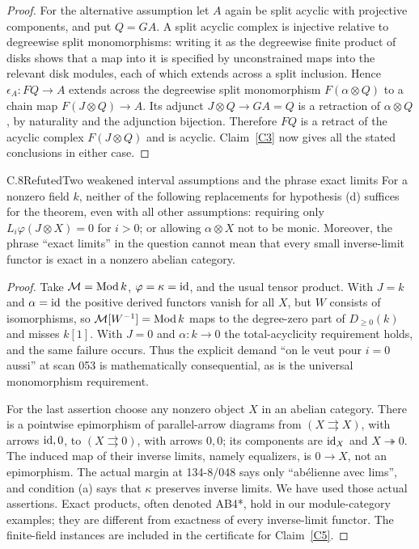 \begin{proof}
For the alternative assumption let $A$ again be split acyclic with projective components, and put $Q=GA$. A split acyclic complex is injective relative to degreewise split monomorphisms: writing it as the degreewise finite product of disks shows that a map into it is specified by unconstrained maps into the relevant disk modules, each of which extends across a split inclusion. Hence $\epsilon_A:FQ\to A$ extends across the degreewise split monomorphism $F(\alpha\otimes Q)$ to a chain map $F(J\otimes Q)\to A$. Its adjunct $J\otimes Q\to GA=Q$ is a retraction of $\alpha\otimes Q$, by naturality and the adjunction bijection. Therefore $FQ$ is a retract of the acyclic complex $F(J\otimes Q)$ and is acyclic. Claim~\ref{C3} now gives all the stated conclusions in either case.
\end{proof}

\begin{claim}{C.8}{Refuted}{Two weakened interval assumptions and the phrase exact limits}\label{C8}
For a nonzero field $k$, neither of the following replacements for hypothesis (d) suffices for the theorem, even with all other assumptions: requiring only $L_i\varphi(J\otimes X)=0$ for $i>0$; or allowing $\alpha\otimes X$ not to be monic. Moreover, the phrase ``exact limits'' in the question cannot mean that every small inverse-limit functor is exact in a nonzero abelian category.
\end{claim}
\begin{proof}
Take $\mathcal M=\operatorname{Mod} k$, $\varphi=\kappa=\operatorname{id}$, and the usual tensor product. With $J=k$ and $\alpha=\operatorname{id}$ the positive derived functors vanish for all $X$, but $W$ consists of isomorphisms, so $\mathcal M[W^{-1}]=\operatorname{Mod} k$ maps to the degree-zero part of $D_{\geq0}(k)$ and misses $k[1]$. With $J=0$ and $\alpha:k\to0$ the total-acyclicity requirement holds, and the same failure occurs. Thus the explicit demand ``on le veut pour $i=0$ aussi'' at scan 053 is mathematically consequential, as is the universal monomorphism requirement.

For the last assertion choose any nonzero object $X$ in an abelian category. There is a pointwise epimorphism of parallel-arrow diagrams from $(X\rightrightarrows X)$, with arrows $\operatorname{id},0$, to $(X\rightrightarrows0)$, with arrows $0,0$; its components are $\operatorname{id}_X$ and $X\twoheadrightarrow0$. The induced map of their inverse limits, namely equalizers, is $0\to X$, not an epimorphism. The actual margin at 134-8/048 says only ``abélienne avec lims'', and condition (a) says that $\kappa$ preserves inverse limits. We have used those actual assertions. Exact products, often denoted AB4*, hold in our module-category examples; they are different from exactness of every inverse-limit functor. The finite-field instances are included in the certificate for Claim~\ref{C5}.
\end{proof}

